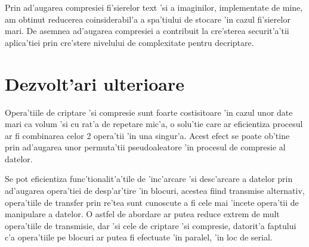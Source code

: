 \documentclass[12pt,a4paper,twoside]{report}
\begin{document}
Prin ad'augarea compresiei fi'sierelor text 'si a imaginilor, implementate de mine,  am obtinut reducerea coinsiderabil'a a spa'tiului de stocare 'in cazul fi'sierelor mari. De asemnea ad'augarea compresiei a contribuit la cre'sterea securit'a'tii aplica'tiei prin cre'stere nivelului de complexitate pentru decriptare. 


\section{Dezvolt'ari ulterioare}

Opera'tiile de criptare 'si compresie sunt foarte costisitoare 'in cazul unor date mari ca volum 'si cu rat'a de repetare mic'a, o solu'tie care ar eficientiza procesul ar fi combinarea celor 2 opera'tii 'in una singur'a. Acest efect se poate ob'tine prin ad'augarea unor permuta'tii pseudoaleatore 'in procesul de compresie al datelor\cite{comp_crypto}.

Se pot eficientiza func'tionalit'a'tile de 'inc'arcare 'si desc'arcare a datelor prin ad'augarea opera'tiei de desp'ar'tire 'in blocuri, acestea fiind transmise alternativ, opera'tiile de transfer prin re'tea sunt cunoscute a fi cele mai 'incete opera'tii de manipulare a datelor. O astfel de abordare ar putea reduce extrem de mult opera'tiile de transmisie, dar 'si cele de criptare 'si compresie, datorit'a faptului c'a opera'tiile pe blocuri ar putea fi efectuate 'in paralel, 'in loc de serial.


 


\end{document}

